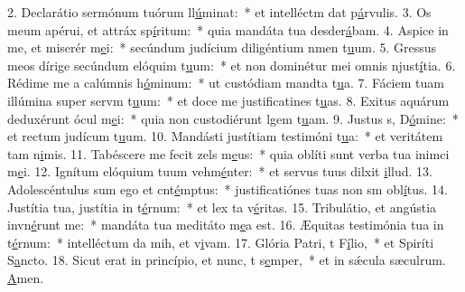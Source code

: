 2. Declarátio sermónum tuórum ll\uline{ú}minat:~* et intelléctm dat p\uline{á}rvulis.
3. Os meum apérui, et attráx sp\uline{í}ritum:~* quia mandáta tua desder\uline{á}bam.
4. Aspice in me, et miserér m\uline{e}i:~* secúndum judícium diligéntium nmen t\uline{u}um.
5. Gressus meos dírige secúndum elóquim t\uline{u}um:~* et non dominétur mei omnis njust\uline{í}tia.
6. Rédime me a calúmnis h\uline{ó}minum:~* ut custódiam mandta t\uline{u}a.
7. Fáciem tuam illúmina super servm t\uline{u}um:~* et doce me justificatines t\uline{u}as.
8. Exitus aquárum deduxérunt ócul m\uline{e}i:~* quia non custodiérunt lgem t\uline{u}am.
9. Justus s, D\uline{ó}mine:~* et rectum judícum t\uline{u}um.
10. Mandásti justítiam testimóni t\uline{u}a:~* et veritátem tam n\uline{i}mis.
11. Tabéscere me fecit zels m\uline{e}us:~* quia oblíti sunt verba tua inimci m\uline{e}i.
12. Ignítum elóquium tuum vehm\uline{é}nter:~* et servus tuus dilxit \uline{i}llud.
13. Adolescéntulus sum ego et cnt\uline{é}mptus:~* justificatiónes tuas non sm obl\uline{í}tus.
14. Justítia tua, justítia in t\uline{é}rnum:~* et lex ta v\uline{é}ritas.
15. Tribulátio, et angústia invn\uline{é}runt me:~* mandáta tua meditáto m\uline{e}a est.
16. Æquitas testimónia tua in t\uline{é}rnum:~* intelléctum da mih, et v\uline{i}vam.
17. Glória Patri, t F\uline{í}lio,~* et Spiríti S\uline{a}ncto.
18. Sicut erat in princípio, et nunc, t s\uline{e}mper,~* et in sǽcula sæculrum. \uline{A}men.
